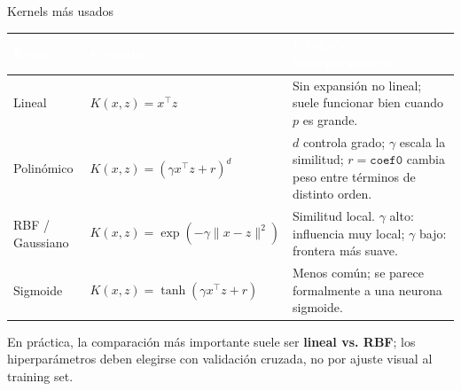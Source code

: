 \begin{frame}{Kernels más usados}
\scriptsize
\renewcommand{\arraystretch}{1.45}
\setlength{\tabcolsep}{5.0pt}
\begin{center}
\begin{tabular}{p{2.2cm}p{5.0cm}p{5.0cm}}
\toprule
\rowcolor{ccdenavy}
\textcolor{white}{\textbf{Kernel}} &
\textcolor{white}{\textbf{Fórmula}} &
\textcolor{white}{\textbf{Intuición / hiperparámetros}}\\
\midrule
Lineal & $K(x,z)=x^\top z$ & Sin expansión no lineal; suele funcionar bien cuando $p$ es grande.\\
\rowcolor{ccdeice!50}
Polinómico & $K(x,z)=(\gamma x^\top z+r)^d$ & $d$ controla grado; $\gamma$ escala la similitud; $r=\texttt{coef0}$ cambia peso entre términos de distinto orden.\\
RBF / Gaussiano & $K(x,z)=\exp(-\gamma\|x-z\|^2)$ & Similitud local. $\gamma$ alto: influencia muy local; $\gamma$ bajo: frontera más suave.\\
\rowcolor{ccdeice!50}
Sigmoide & $K(x,z)=\tanh(\gamma x^\top z+r)$ & Menos común; se parece formalmente a una neurona sigmoide.\\
\bottomrule
\end{tabular}
\end{center}
\vspace{0.16cm}
\begin{keybox}
En práctica, la comparación más importante suele ser \textbf{lineal vs. RBF}; los hiperparámetros deben elegirse con validación cruzada, no por ajuste visual al training set.
\end{keybox}
\end{frame}

